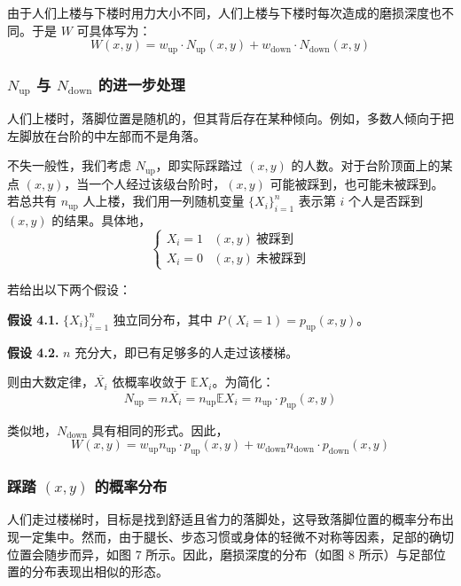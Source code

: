 \documentclass[11pt,a4paper]{ctexart}
\newcommand{\cfgup}{\mathrm{up}}
\newcommand{\cfgdown}{\mathrm{down}}
\begin{document}
由于人们上楼与下楼时用力大小不同，人们上楼与下楼时每次造成的磨损深度也不同。于是 $W$ 可具体写为：
\begin{equation}
W(x,y) = w_{\cfgup}\cdot N_{\cfgup}(x,y) + w_{\cfgdown}\cdot N_{\cfgdown}(x,y)
\end{equation}

\subsubsection{$N_{\cfgup}$ 与 $N_{\cfgdown}$ 的进一步处理}

人们上楼时，落脚位置是随机的，但其背后存在某种倾向。例如，多数人倾向于把左脚放在台阶的中左部而不是角落。

不失一般性，我们考虑 $N_{\cfgup}$，即实际踩踏过 $(x,y)$ 的人数。对于台阶顶面上的某点 $(x,y)$，当一个人经过该级台阶时，$(x,y)$ 可能被踩到，也可能未被踩到。若总共有 $n_{\cfgup}$ 人上楼，我们用一列随机变量 $\{X_i\}_{i=1}^{n}$ 表示第 $i$ 个人是否踩到 $(x,y)$ 的结果。具体地，
\begin{equation}
\begin{cases}
X_i = 1 & (x,y)\ \text{被踩到}\\
X_i = 0 & (x,y)\ \text{未被踩到}
\end{cases}
\end{equation}

若给出以下两个假设：

\noindent\textbf{假设 4.1.} $\{X_i\}_{i=1}^{n}$ 独立同分布，其中 $P(X_i = 1) = p_{\cfgup}(x,y)$。

\noindent\textbf{假设 4.2.} $n$ 充分大，即已有足够多的人走过该楼梯。

则由大数定律，$\overline{X_i}$ 依概率收敛于 $\mathbb{E}X_i$。为简化：
\begin{equation}
N_{\cfgup} = n\overline{X_i} = n_{\cfgup}\mathbb{E}X_i = n_{\cfgup}\cdot p_{\cfgup}(x,y)
\end{equation}

类似地，$N_{\cfgdown}$ 具有相同的形式。因此，
\begin{equation}
W(x,y) = w_{\cfgup}n_{\cfgup}\cdot p_{\cfgup}(x,y) + w_{\cfgdown}n_{\cfgdown}\cdot p_{\cfgdown}(x,y)
\end{equation}

\subsubsection{踩踏 $(x,y)$ 的概率分布}

人们走过楼梯时，目标是找到舒适且省力的落脚处，这导致落脚位置的概率分布出现一定集中。然而，由于腿长、步态习惯或身体的轻微不对称等因素，足部的确切位置会随步而异，如图 7 所示。因此，磨损深度的分布（如图 8 所示）与足部位置的分布表现出相似的形态。
\end{document}
